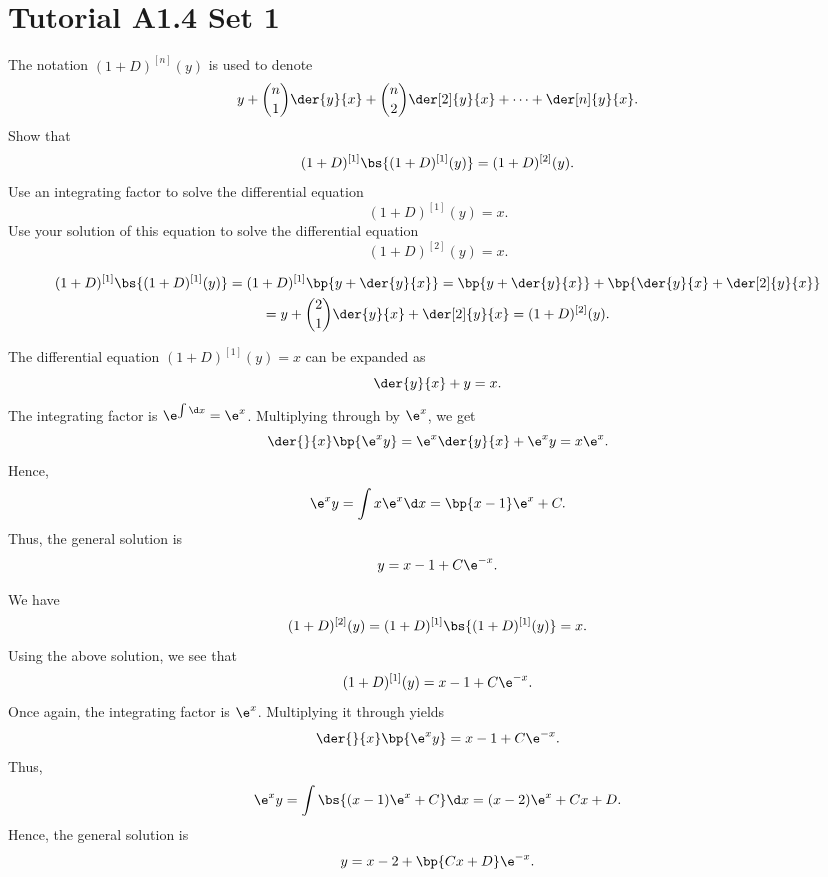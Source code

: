 \section{Tutorial A1.4 Set 1}

\begin{problem}
    The notation $(1 + D)^{[n]}(y)$ is used to denote \[y + \binom{n}{1} \der{y}{x} + \binom{n}{2} \der[2]{y}{x} + \dots + \der[n]{y}{x}.\] Show that \[(1 + D)^{[1]} \bs{(1 + D)^{[1]} (y)} = (1 + D)^{[2]} (y).\] Use an integrating factor to solve the differential equation \[(1 + D)^{[1]}(y) = x.\] Use your solution of this equation to solve the differential equation \[(1 + D)^{[2]}(y) = x.\]
\end{problem}
\begin{solution}
    \begin{gather*}
        (1 + D)^{[1]} \bs{(1 + D)^{[1]} (y)} = (1 + D)^{[1]} \bp{y + \der{y}{x}} = \bp{y + \der{y}{x}} + \bp{\der{y}{x} + \der[2]{y}{x}}\\
        = y + \binom{2}{1} \der{y}{x} + \der[2]{y}{x} = (1 + D)^{[2]} (y).
    \end{gather*}

    The differential equation $(1 + D)^{[1]}(y) = x$ can be expanded as \[\der{y}{x} + y = x.\] The integrating factor is $\e^{\int \d x} = \e^x$. Multiplying through by $\e^x$, we get \[\der{}{x} \bp{\e^x y} = \e^x \der{y}{x} + \e^x y = x \e^x.\] Hence, \[\e^x y = \int x \e^x \d x = \bp{x-1} \e^x + C.\] Thus, the general solution is \[y = x - 1 + C\e^{-x}.\]

    We have \[(1 + D)^{[2]}(y) = (1 + D)^{[1]} \bs{(1 + D)^{[1]} (y)} = x.\] Using the above solution, we see that \[(1 + D)^{[1]}(y) = x - 1 + C\e^{-x}.\] Once again, the integrating factor is $\e^x$. Multiplying it through yields \[\der{}{x} \bp{\e^x y} = x - 1 + C\e^{-x}.\] Thus, \[\e^x y = \int \bs{(x-1)\e^x + C} \d x = (x-2)\e^x + Cx + D.\] Hence, the general solution is \[y = x-2 + \bp{Cx + D} \e^{-x}.\]
\end{solution}

